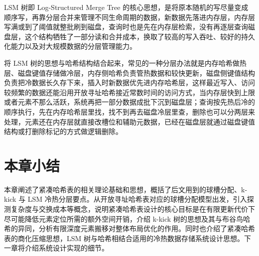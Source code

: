 LSM 树即 Log-Structured Merge Tree 的核心思想，是将原本随机的写尽量变成顺序写，再靠分层合并来管理不同生命周期的数据\cite{oneil1996lsm}，新数据先落进内存层，内存层写满或到了阈值就整批刷到磁盘，查询时也是先在内存层检索，没有再逐层查询磁盘层，这个结构牺牲了一部分读和合并成本，换取了较高的写入吞吐、较好的持久化能力以及对大规模数据的分层管理能力。

将 LSM 树的思想与哈希结构结合起来，常见的一种分层办法就是内存哈希做热层、磁盘键值存储做冷层，内存侧哈希负责管热数据和较快更新，磁盘侧键值结构负责把冷数据长久存下来，插入时新数据优先进内存哈希层，这样最近写入、访问较频繁的数据还能沿用开放寻址哈希接近常数时间的访问方式，当内存层快到上限或者元素不那么活跃，系统再把一部分数据成批下沉到磁盘层；查询按先热后冷的顺序执行，先在内存哈希层里找，找不到再去磁盘冷层里查，删除也可以分两层来处理，元素还在内存层就直接改槽位和辅助元数据，已经在磁盘层就通过磁盘键值结构或打删除标记的方式做逻辑删除。

\section{本章小结}

本章阐述了紧凑哈希表的相关理论基础和思想，概括了后文用到的球槽分配、k-kick 与 LSM 冷热分层要点。从开放寻址哈希表对应的球槽分配模型出发，引入探测复杂度与交换成本等概念，说明紧凑哈希表设计的核心目标是在有限更新代价下尽可能降低元素定位所需的额外空间开销，介绍 k-kick 树的思想及其与布谷鸟哈希的异同，分析有限深度元素搬移对整体布局优化的作用。同时也介绍了紧凑哈希表的商化压缩思想，LSM 树与哈希相结合适用的冷热数据存储系统设计思想。下一章将介绍系统设计实现的细节。
